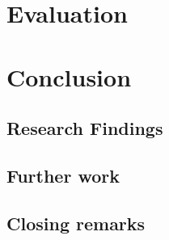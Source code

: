 \documentclass[UKenglish]{ifimaster}
\begin{document}
\chapter{Evaluation}


\chapter{Conclusion}                    
\section{Research Findings}
\section{Further work}
\section{Closing remarks}

\backmatter{}
\printbibliography
\end{document}
